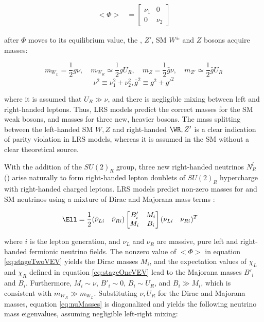 \begin{align}
	<\Phi> &= \begin{bmatrix}
	\nu_{1} & 0 \\
	0 & \nu_{2}
	\end{bmatrix}
	\label{eq:stageTwoVEV}
\end{align}

after $\Phi$ moves to its equilibrium value, the \WR, $Z'$, SM $W^{\pm}$ and $Z$ bosons acquire masses:

\begin{equation}
	m_{W_{L}} = \frac{1}{2}g\nu ,\quad m_{W_{R}} \simeq \frac{1}{2}gU_{R} ,\quad m_{Z} = \frac{1}{2}\bar{g}\nu ,\quad m_{Z'} \simeq \frac{1}{2}\bar{g}U_{R}
\end{equation}
\begin{equation}
	\nu^{2} \equiv \nu^{2}_{1} + \nu^{2}_{2} , \bar{g}^{2} \equiv g^{2} + g'^{2}
\end{equation}

where it is assumed that $U_{R} \gg \nu$, and there is negligible mixing between left and right-handed leptons.  
Thus, LRS models predict the correct masses for the SM weak bosons, and masses for three new, heavier bosons.  
The mass splitting between the left-handed SM $W,Z$ and right-handed $\WR,Z'$ is a clear indication of parity 
violation in LRS models, whereas it is assumed in the SM without a clear theoretical source.

With the addition of the $SU(2)_{R}$ group, three new right-handed neutrinos $N^{l}_{R}$ (\nul) arise naturally 
to form right-handed lepton doublets of $SU(2)_{R}$ hypercharge with right-handed charged leptons.  LRS models 
predict non-zero masses for \nul and SM neutrinos using a mixture of Dirac and Majorana mass terms \cite{seeSawAndParityViolation,seeSawAndGUTs}:

\begin{align}
	\Ell &= \frac{1}{2}(\bar{\nu}_{Li} \quad \bar{\nu}_{Ri})\begin{bmatrix}
	B'_{i} & M_{i} \\
	M_{i} & B_{i}
\end{bmatrix}(\nu_{Li} \quad \nu_{Ri})^{T}
\label{eq:nuMasses}
\end{align}

where $i$ is the lepton generation, and $\nu_{L}$ and $\nu_{R}$ are massive, pure left and right-handed 
fermionic neutrino fields.  The nonzero value of $<\Phi>$ in equation \ref{eq:stageTwoVEV} yields the 
Dirac masses $M_{i}$, and the expectation values of $\chi_{L}$ and $\chi_{R}$ defined in equation \ref{eq:stageOneVEV} 
lead to the Majorana masses $B'_{i}$ and $B_{i}$.  Furthermore, $M_{i} \sim \nu$, $B'_{i} \sim 0$, 
$B_{i} \sim U_{R}$, and $B_{i} \gg M_{i}$, which is consistent with $m_{W_{R}} \gg m_{W_{L}}$.  Substituting 
$\nu,U_{R}$ for the Dirac and Majorana masses, equation \ref{eq:nuMasses} is diagonalized and yields 
the following neutrino mass eigenvalues, assuming negligible left-right mixing:

